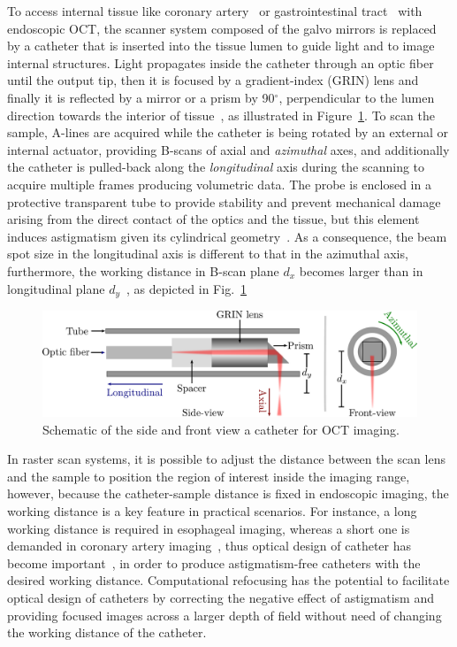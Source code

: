 To access internal tissue like coronary artery~\cite{Brezinski1996_Imaging} or gastrointestinal tract~\cite{Isenberg2003_Gastrointestinal} with endoscopic OCT, the scanner system composed of the galvo mirrors is replaced by a catheter that is inserted into the tissue lumen to guide light and to image internal structures. Light propagates inside the catheter through an optic fiber until the output tip, then it is focused by a gradient-index (GRIN) lens and finally it is reflected by a mirror or a prism by 90$^\circ$,  perpendicular to the lumen direction towards the interior of tissue~\cite{Hu2015_Optical}, as illustrated in Figure~\ref{fig:CatheterSchematic}. To scan the sample, A-lines are acquired while the catheter is being rotated by an external or internal actuator, providing B-scans of axial and \textit{azimuthal} axes, and additionally the catheter is pulled-back along the \textit{longitudinal} axis during the scanning to acquire multiple frames producing volumetric data. The probe is enclosed in a protective transparent tube to provide stability and prevent mechanical damage arising from the direct contact of the optics and the tissue, but this element induces astigmatism given its cylindrical geometry~\cite{Hu2015_Optical, Wang2012_Numerical, Xi2009_Highresolution}. As a consequence, the beam spot size in the longitudinal axis is different to that in the azimuthal axis, furthermore, the working distance in B-scan plane $d_x$ becomes larger than in longitudinal plane $d_y$~\cite{Wang2012_Numerical}, as depicted in Fig.~\ref{fig:CatheterSchematic}

\begin{figure}[htb!]
	\centering
	\includegraphics[width=.9\textwidth]{Figures/Results/CatheterSchematic.pdf}
	\caption[Schematic of a catheter for endoscopic OCT imaging.]{Schematic of the side and front view a catheter for OCT imaging.}
	\label{fig:CatheterSchematic}
\end{figure}

In raster scan systems, it is possible to adjust the distance between the scan lens and the sample to position the region of interest inside the imaging range, however, because the catheter-sample distance is fixed in endoscopic imaging, the working distance is a key feature in practical scenarios. For instance, a long working distance is required in esophageal imaging, whereas a short one is demanded in coronary artery imaging~\cite{Wang2012_Numerical}, thus optical design of catheter has become important~\cite{Hu2015_Optical, Xi2009_Highresolution, Kang2010_Endoscopically}, in order to produce astigmatism-free catheters with the desired working distance. Computational refocusing has the potential to facilitate optical design of catheters by correcting the negative effect of astigmatism and providing focused images across a larger depth of field without need of changing the working distance of the catheter.


